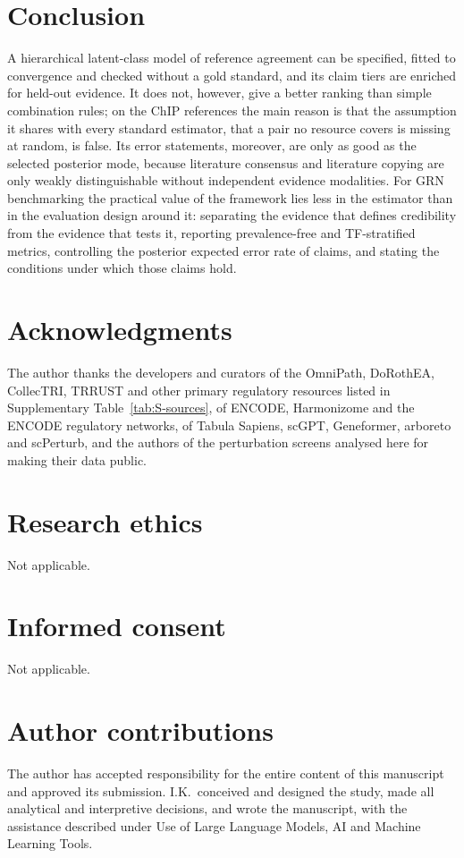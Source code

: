 \documentclass[11pt,a4paper]{article}
\begin{document}
\section{Conclusion}\label{sec:conclusion}

A hierarchical latent-class model of reference agreement can be specified, fitted to convergence and checked without a gold standard, and its claim tiers are enriched for held-out evidence.
It does not, however, give a better ranking than simple combination rules; on the ChIP references the main reason is that the assumption it shares with every standard estimator, that a pair no resource covers is missing at random, is false.
Its error statements, moreover, are only as good as the selected posterior mode, because literature consensus and literature copying are only weakly distinguishable without independent evidence modalities.
For GRN benchmarking the practical value of the framework lies less in the estimator than in the evaluation design around it: separating the evidence that defines credibility from the evidence that tests it, reporting prevalence-free and TF-stratified metrics, controlling the posterior expected error rate of claims, and stating the conditions under which those claims hold.

\section*{Acknowledgments}
The author thanks the developers and curators of the OmniPath, DoRothEA, CollecTRI, TRRUST and other primary regulatory resources listed in Supplementary Table~\ref{tab:S-sources}, of ENCODE, Harmonizome and the ENCODE regulatory networks, of Tabula Sapiens, scGPT, Geneformer, arboreto and scPerturb, and the authors of the perturbation screens analysed here for making their data public.

\section*{Research ethics}
Not applicable.

\section*{Informed consent}
Not applicable.

\section*{Author contributions}
The author has accepted responsibility for the entire content of this manuscript and approved its submission. I.K.\ conceived and designed the study, made all analytical and interpretive decisions, and wrote the manuscript, with the assistance described under Use of Large Language Models, AI and Machine Learning Tools.
\end{document}
